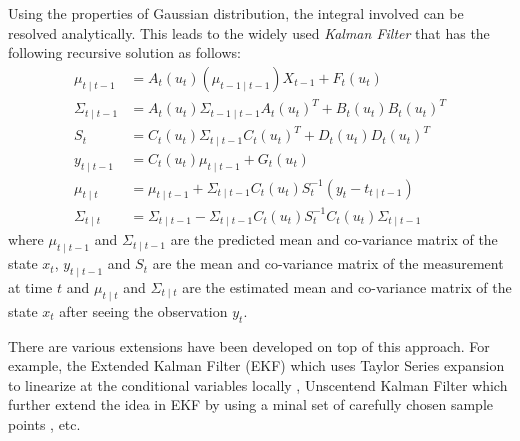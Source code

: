 Using the properties of Gaussian distribution, the integral involved can be resolved analytically. This leads to the widely used \emph{Kalman Filter} \cite{KRE60} that has the following recursive solution as follows:
\begin{align}
  \mu_{t \mid t -1} &= A_{t}(u_t)(\mu_{t-1 \mid t-1})X_{t-1} + F_t(u_t) \\
  \Sigma_{t \mid t -1} &= A_{t}(u_t)\Sigma_{t -1 \mid t -1}A_{t}(u_t)^T +  B_t(u_t)B_t(u_t)^T \\
  S_t &=  C_{t}(u_t)\Sigma_{t \mid t -1}C_{t}(u_t)^T +  D_t(u_t)D_t(u_t)^T \\
  y_{t \mid t-1} &=  C_{t}(u_t)  \mu_{t \mid t -1} + G_t(u_t) \\
  \mu_{t \mid t} &=   \mu_{t \mid t -1} +   \Sigma_{t \mid t -1} C_{t}(u_t)S_t^{-1}(y_t - t_{t \mid t-1}) \\
  \Sigma_{t \mid t} &=  \Sigma_{t \mid t -1} -\Sigma_{t \mid t -1} C_{t}(u_t)S_t^{-1} C_{t}(u_t)\Sigma_{t \mid t -1}
\end{align}
where  $\mu_{t \mid t -1}$ and $\Sigma_{t \mid t -1}$ are the predicted mean and co-variance matrix of the state $x_t$, $y_{t \mid t-1}$ and $S_t$ are the mean and co-variance matrix of the measurement at time $t$ and $\mu_{t \mid t}$ and $\Sigma_{t \mid t}$ are the estimated mean and co-variance matrix of the state $x_t$ after seeing the observation $y_t$.

There are various extensions have been developed on top of this approach. For example, the Extended Kalman Filter (EKF) which uses Taylor Series expansion to linearize at the conditional variables locally \cite{WG95}, Unscentend Kalman Filter which further extend the idea in EKF by using a minal set of carefully chosen sample points \cite{EW01}, etc.

